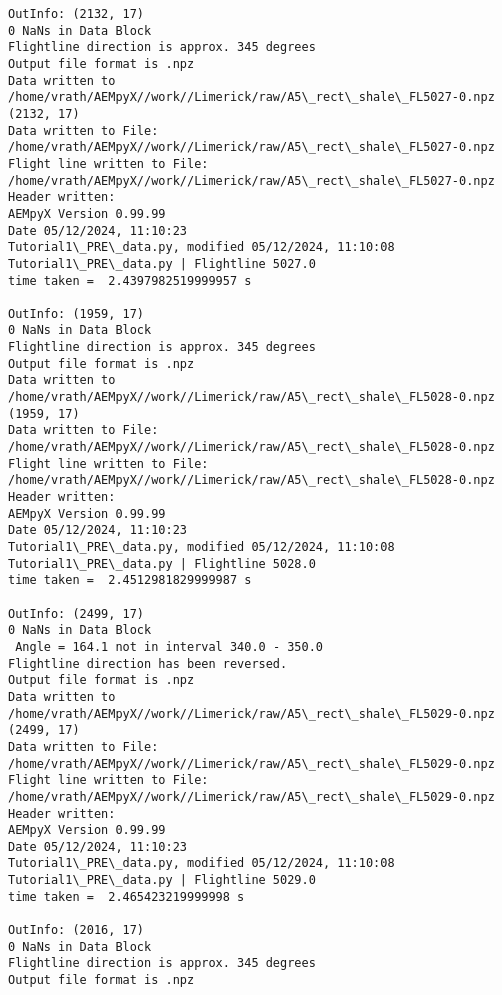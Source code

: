 \documentclass[11pt]{article}
\begin{document}
\begin{Verbatim}[commandchars=\\\{\}]
OutInfo: (2132, 17)
0 NaNs in Data Block
Flightline direction is approx. 345 degrees
Output file format is .npz
Data written to
/home/vrath/AEMpyX//work//Limerick/raw/A5\_rect\_shale\_FL5027-0.npz
(2132, 17)
Data written to File:
/home/vrath/AEMpyX//work//Limerick/raw/A5\_rect\_shale\_FL5027-0.npz
Flight line written to File:
/home/vrath/AEMpyX//work//Limerick/raw/A5\_rect\_shale\_FL5027-0.npz
Header written:
AEMpyX Version 0.99.99
Date 05/12/2024, 11:10:23
Tutorial1\_PRE\_data.py, modified 05/12/2024, 11:10:08
Tutorial1\_PRE\_data.py | Flightline 5027.0
time taken =  2.4397982519999957 s

OutInfo: (1959, 17)
0 NaNs in Data Block
Flightline direction is approx. 345 degrees
Output file format is .npz
Data written to
/home/vrath/AEMpyX//work//Limerick/raw/A5\_rect\_shale\_FL5028-0.npz
(1959, 17)
Data written to File:
/home/vrath/AEMpyX//work//Limerick/raw/A5\_rect\_shale\_FL5028-0.npz
Flight line written to File:
/home/vrath/AEMpyX//work//Limerick/raw/A5\_rect\_shale\_FL5028-0.npz
Header written:
AEMpyX Version 0.99.99
Date 05/12/2024, 11:10:23
Tutorial1\_PRE\_data.py, modified 05/12/2024, 11:10:08
Tutorial1\_PRE\_data.py | Flightline 5028.0
time taken =  2.4512981829999987 s

OutInfo: (2499, 17)
0 NaNs in Data Block
 Angle = 164.1 not in interval 340.0 - 350.0
Flightline direction has been reversed.
Output file format is .npz
Data written to
/home/vrath/AEMpyX//work//Limerick/raw/A5\_rect\_shale\_FL5029-0.npz
(2499, 17)
Data written to File:
/home/vrath/AEMpyX//work//Limerick/raw/A5\_rect\_shale\_FL5029-0.npz
Flight line written to File:
/home/vrath/AEMpyX//work//Limerick/raw/A5\_rect\_shale\_FL5029-0.npz
Header written:
AEMpyX Version 0.99.99
Date 05/12/2024, 11:10:23
Tutorial1\_PRE\_data.py, modified 05/12/2024, 11:10:08
Tutorial1\_PRE\_data.py | Flightline 5029.0
time taken =  2.465423219999998 s

OutInfo: (2016, 17)
0 NaNs in Data Block
Flightline direction is approx. 345 degrees
Output file format is .npz
    \end{Verbatim}
\end{document}
